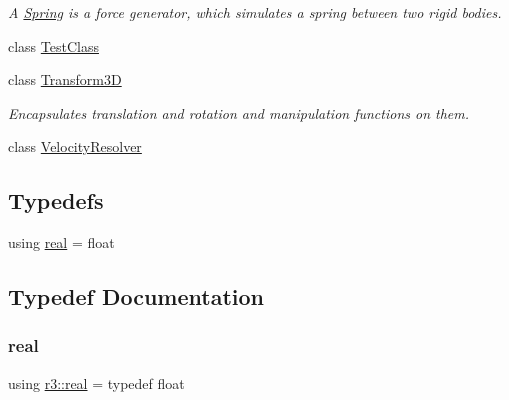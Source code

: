 \begin{DoxyCompactItemize}
\begin{DoxyCompactList}\small\item\em A \mbox{\hyperlink{classr3_1_1_spring}{Spring}} is a force generator, which simulates a spring between two rigid bodies. \end{DoxyCompactList}\item 
class \mbox{\hyperlink{classr3_1_1_test_class}{Test\+Class}}
\item 
class \mbox{\hyperlink{classr3_1_1_transform3_d}{Transform3D}}
\begin{DoxyCompactList}\small\item\em Encapsulates translation and rotation and manipulation functions on them. \end{DoxyCompactList}\item 
class \mbox{\hyperlink{classr3_1_1_velocity_resolver}{Velocity\+Resolver}}
\end{DoxyCompactItemize}
\subsection*{Typedefs}
\begin{DoxyCompactItemize}
\item 
using \mbox{\hyperlink{namespacer3_ab2016b3e3f743fb735afce242f0dc1eb}{real}} = float
\end{DoxyCompactItemize}


\subsection{Typedef Documentation}
\mbox{\label{namespacer3_ab2016b3e3f743fb735afce242f0dc1eb}} 
\subsubsection{\texorpdfstring{real}{real}}
{\footnotesize\ttfamily using \mbox{\hyperlink{namespacer3_ab2016b3e3f743fb735afce242f0dc1eb}{r3\+::real}} = typedef float}


